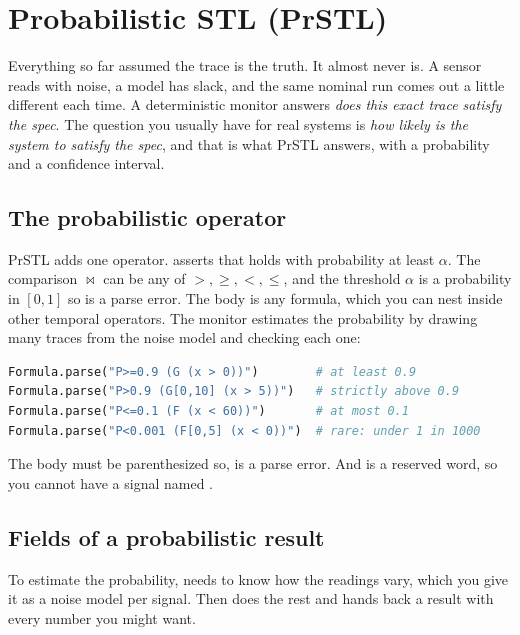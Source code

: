 \chapter{Probabilistic STL (PrSTL)}
\label{ch:prstl}

Everything so far assumed the trace is the truth. It almost never is. A sensor reads with noise, a model has slack, and the same nominal run comes out a little different each time. A deterministic monitor answers \emph{does this exact trace satisfy the spec}. The question you usually have for real systems is \emph{how likely is the system to satisfy the spec}, and that is what PrSTL answers, with a probability and a confidence interval.

\section{The probabilistic operator}

PrSTL adds one operator.  asserts that  holds with probability at least $\alpha$. The comparison $\bowtie$ can be any of $>, \ge, <, \le$, and the threshold $\alpha$ is a probability in $[0, 1]$ so  is a parse error. The body  is any formula, which you can nest inside other temporal operators. The monitor estimates the probability by drawing many traces from the noise model and checking each one:

\begin{lstlisting}[language=Python]
Formula.parse("P>=0.9 (G (x > 0))")        # at least 0.9
Formula.parse("P>0.9 (G[0,10] (x > 5))")   # strictly above 0.9
Formula.parse("P<=0.1 (F (x < 60))")       # at most 0.1
Formula.parse("P<0.001 (F[0,5] (x < 0))")  # rare: under 1 in 1000
\end{lstlisting}

The body must be parenthesized so,  is a parse error. And  is a reserved word, so you cannot have a signal named .

\section{Fields of a probabilistic result}

To estimate the probability, \sentil{} needs to know how the readings vary, which you give it as a noise model per signal. Then  does the rest and hands back a result with every number you might want.


